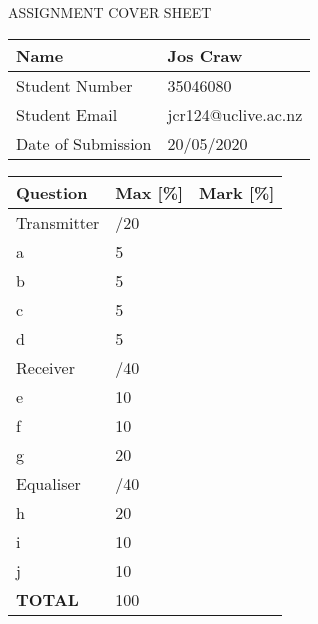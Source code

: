 \documentclass{article}
\begin{document}
\begin{center}
    {\huge ASSIGNMENT COVER SHEET}
\end{center}

\vspace{3em}

\begin{center}
    \renewcommand*{\arraystretch}{1.2}
    \begin{tabular} { | m{5cm} | m{4cm} | }
        \hline
        {\large Name} & {\large Jos Craw}\\
        \hline
        {\large Student Number} & {\large 35046080}\\
        \hline
        {\large Student Email} & {\large jcr124@uclive.ac.nz}\\
        \hline
        {\large Date of Submission} & {\large 20/05/2020}\\
        \hline
    \end{tabular}
\end{center}

\vspace{5em}

\begin{center}
    \renewcommand*{\arraystretch}{1.4}
    \begin{tabular} { | m{3cm} | m{3cm} | m{5cm} | }
        \hline
        {\large Question} & {\large Max [\%]} & {\large Mark [\%]} \\
        \hline
        {\large Transmitter} & {\large /20} & {\large }\\
        \hline
        {\large a} & {\large 5} & {\large}\\
        \hline
        {\large b} & {\large 5} & {\large}\\
        \hline
        {\large c} & {\large 5} & {\large}\\
        \hline
        {\large d} & {\large 5} & {\large}\\
        \hline
        {\large Receiver} & {\large /40} & {\large }\\
        \hline
        {\large e} & {\large 10} & {\large}\\
        \hline
        {\large f} & {\large 10} & {\large}\\
        \hline
        {\large g} & {\large 20} & {\large}\\
        \hline
        {\large Equaliser} & {\large /40} & {\large }\\
        \hline
        {\large h} & {\large 20} & {\large}\\
        \hline
        {\large i} & {\large 10} & {\large}\\
        \hline
        {\large j} & {\large 10} & {\large}\\
        \hline
        {\large \textbf{TOTAL}} & {\large 100} & {\large}\\
        \hline
    \end{tabular}
\end{center}
\end{document}
